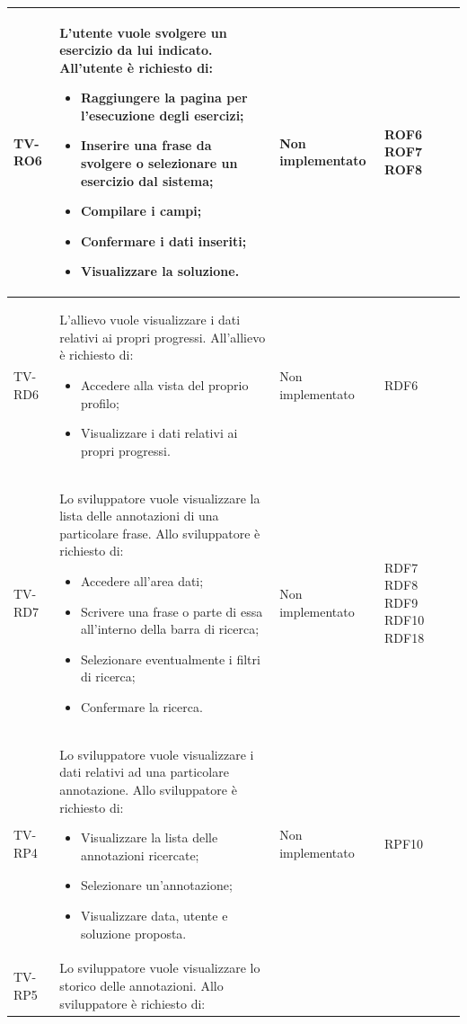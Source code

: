 \begin{longtable}{|>{\centering\arraybackslash}m{1.6cm}|>{\centering\arraybackslash}m{6.41cm}|>{\centering\arraybackslash}m{3.1cm} | >{\centering\arraybackslash}m{2.6cm}|}
		  \rowcolor{LightGray}
		TV-RO6 & L'utente vuole svolgere un esercizio da lui indicato. All'utente è richiesto di:
		\begin{itemize}
			\item Raggiungere la pagina per l'esecuzione degli esercizi;
			\item Inserire una frase da svolgere o selezionare un esercizio dal sistema;
			\item Compilare i campi;
			\item Confermare i dati inseriti;
			\item Visualizzare la soluzione.
		\end{itemize}& Non implementato  & ROF6 ROF7 ROF8\\ \hline
		TV-RD6 & L'allievo vuole visualizzare i dati relativi ai propri progressi. All'allievo è richiesto di:
		\begin{itemize}
			\item Accedere alla vista del proprio profilo;
			\item Visualizzare i dati relativi ai propri progressi.
		\end{itemize}& Non implementato  & RDF6 \\ \hline
		  \rowcolor{LightGray}
		TV-RD7 & Lo sviluppatore vuole visualizzare la lista delle annotazioni di una particolare frase. Allo sviluppatore è richiesto di: 
		\begin{itemize}
			\item Accedere all'area dati;
			\item Scrivere una frase o parte di essa all'interno della barra di ricerca;
			\item Selezionare eventualmente i filtri di ricerca;
			\item Confermare la ricerca.
		\end{itemize}& Non implementato  & RDF7 RDF8 RDF9 RDF10 RDF18 \\ \hline
		TV-RP4 & Lo sviluppatore vuole visualizzare i dati relativi ad una particolare annotazione. Allo sviluppatore è richiesto di:
		\begin{itemize}
			\item Visualizzare la lista delle annotazioni ricercate;
			\item Selezionare un'annotazione;
			\item Visualizzare data, utente e soluzione proposta.
		\end{itemize}& Non implementato  & RPF10 \\ \hline
		  \rowcolor{LightGray}
		TV-RP5 & Lo sviluppatore vuole visualizzare lo storico delle annotazioni. Allo sviluppatore è richiesto di:

\end{longtable}
